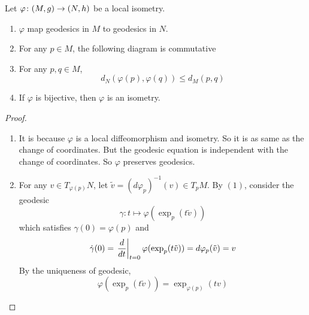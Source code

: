 \begin{enumerate}[label=\arabic{*}.]
	\begin{prop}\label{prop:isoprop}
		Let $\varphi \colon (M,g) \rightarrow (N,h)$ be a local isometry.
		\begin{enumerate}[label=(\arabic{*})]
			\item $\varphi$ map geodesics in $M$ to geodesics in $N$.
			\item For any $p \in M$, the following diagram is commutative
			\begin{center}
			\end{center}
			\item For any $p,q \in M$,
			\begin{equation*}
				d_N(\varphi(p),\varphi(q)) \leq d_M(p,q)
			\end{equation*}
			\item If $\varphi$ is bijective, then $\varphi$ is an isometry.
		\end{enumerate}
	\end{prop}
	\begin{proof}
		\begin{enumerate}[label=(\arabic{*})]
			\item It is because $\varphi$ is a local diffeomorphism and isometry. So it is as same as the change of coordinates. But the geodesic equation is independent with the change of coordinates. So $\varphi$ preserves geodesics.

			\item For any $v \in T_{\varphi(p)}N$, let $\tilde{v} = (d\varphi_p)^{-1}(v) \in T_pM$. By $(1)$, consider the geodesic
			\begin{equation*}
				\gamma \colon t \mapsto \varphi(\exp_p(t\tilde{v}))
			\end{equation*}
			which satisfies $\gamma(0) = \varphi(p)$ and
			\begin{equation*}
				\dot{\gamma}(0) = \left.\frac{d}{dt}\right\lvert_{t = 0}\varphi(\exp_p(t\tilde{v})) = d\varphi_p(\tilde{v}) = v
			\end{equation*}
			By the uniqueness of geodesic,
			\begin{equation*}
				\varphi(\exp_p(t\tilde{v})) = \exp_{\varphi(p)}(tv)
			\end{equation*}


\end{enumerate}
\end{proof}
\end{enumerate}
